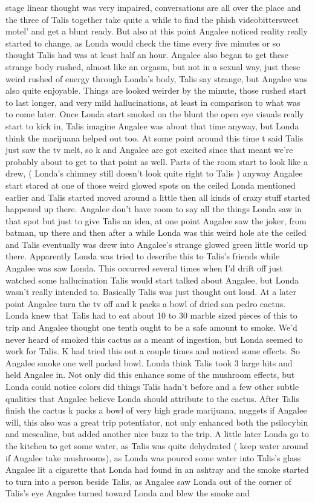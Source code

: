 \documentclass[12pt]{book}
\begin{document}
stage linear thought was very impaired, conversations are all over the place and the three of Talis together take quite a while to find the phish videobittersweet motel' and get a blunt ready. But also at this point Angalee noticed reality really started to change, as Londa would check the time every five minutes or so thought Talis had was at least half an hour. Angalee also began to get these strange body rushed, almost like an orgasm, but not in a sexual way, just these weird rushed of energy through Londa's body, Talis say strange, but Angalee was also quite enjoyable. Things are looked weirder by the minute, those rushed start to last longer, and very mild hallucinations, at least in comparison to what was to come later. Once Londa start smoked on the blunt the open eye visuals really start to kick in, Talis imagine Angalee was about that time anyway, but Londa think the marijuana helped out too. At some point around this time t said Talis just saw the tv melt, so k and Angalee are got excited since that meant we're probably about to get to that point as well. Parts of the room start to look like a drew, ( Londa's chimney still doesn't look quite right to Talis ) anyway Angalee start stared at one of those weird glowed spots on the ceiled Londa mentioned earlier and Talis started moved around a little then all kinds of crazy stuff started happened up there. Angalee don't have room to say all the things Londa saw in that spot but just to give Talis an idea, at one point Angalee saw the joker, from batman, up there and then after a while Londa was this weird hole ate the ceiled and Talis eventually was drew into Angalee's strange glowed green little world up there. Apparently Londa was tried to describe this to Talis's friends while Angalee was saw Londa. This occurred several times when I'd drift off just watched some hallucination Talis would start talked about Angalee, but Londa wasn't really intended to. Basically Talis was just thought out loud. At a later point Angalee turn the tv off and k packs a bowl of dried san pedro cactus. Londa knew that Talis had to eat about 10 to 30 marble sized pieces of this to trip and Angalee thought one tenth ought to be a safe amount to smoke. We'd never heard of smoked this cactus as a meant of ingestion, but Londa seemed to work for Talis. K had tried this out a couple times and noticed some effects. So Angalee smoke one well packed bowl. Londa think Talis took 3 large hits and held Angalee in. Not only did this enhance some of the mushroom effects, but Londa could notice colors did things Talis hadn't before and a few other subtle qualities that Angalee believe Londa should attribute to the cactus. After Talis finish the cactus k packs a bowl of very high grade marijuana, nuggets if Angalee will, this also was a great trip potentiator, not only enhanced both the psilocybin and mescaline, but added another nice buzz to the trip. A little later Londa go to the kitchen to get some water, as Talis was quite dehydrated ( keep water around if Angalee take mushrooms), as Londa was poured some water into Talis's glass Angalee lit a cigarette that Londa had found in an ashtray and the smoke started to turn into a person beside Talis, as Angalee saw Londa out of the corner of Talis's eye Angalee turned toward Londa and blew the smoke and 
\end{document}
